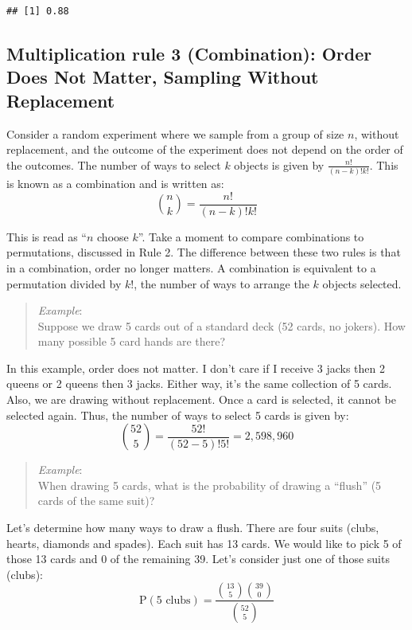 \documentclass[
]{book}
\begin{document}
\begin{verbatim}
## [1] 0.88
\end{verbatim}

\hypertarget{multiplication-rule-3-combination-order-does-not-matter-sampling-without-replacement}{%
\subsection{Multiplication rule 3 (Combination): Order Does Not Matter, Sampling Without Replacement}\label{multiplication-rule-3-combination-order-does-not-matter-sampling-without-replacement}}

Consider a random experiment where we sample from a group of size \(n\), without replacement, and the outcome of the experiment does not depend on the order of the outcomes. The number of ways to select \(k\) objects is given by \(\frac{n!} {(n-k)!k!}\). This is known as a combination and is written as:
\[
\binom{n}{k} = \frac{n!}{(n-k)!k!} 
\]

This is read as ``\(n\) choose \(k\)''. Take a moment to compare combinations to permutations, discussed in Rule 2. The difference between these two rules is that in a combination, order no longer matters. A combination is equivalent to a permutation divided by \(k!\), the number of ways to arrange the \(k\) objects selected.

\begin{quote}
\emph{Example}:\\
Suppose we draw 5 cards out of a standard deck (52 cards, no jokers). How many possible 5 card hands are there?
\end{quote}

In this example, order does not matter. I don't care if I receive 3 jacks then 2 queens or 2 queens then 3 jacks. Either way, it's the same collection of 5 cards. Also, we are drawing without replacement. Once a card is selected, it cannot be selected again. Thus, the number of ways to select 5 cards is given by:
\[
\binom{52}{5} = \frac{52!}{(52-5)!5!} = 2,598,960
\]

\begin{quote}
\emph{Example}:\\
When drawing 5 cards, what is the probability of drawing a ``flush'' (5 cards of the same suit)?
\end{quote}

Let's determine how many ways to draw a flush. There are four suits (clubs, hearts, diamonds and spades). Each suit has 13 cards. We would like to pick 5 of those 13 cards and 0 of the remaining 39. Let's consider just one of those suits (clubs):
\[
\mbox{P}(\mbox{5 clubs})=\frac{\binom{13}{5}\binom{39}{0}}{\binom{52}{5}}
\]
\end{document}
